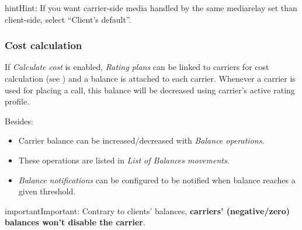 \documentclass[letterpaper,10pt,english]{sphinxmanual}
\begin{document}
\begin{notice}{hint}{Hint:}
If you want carrier-side media handled by the same mediarelay set than client-side, select ``Client's default''.
\end{notice}


\subsubsection{Cost calculation}
\label{administration_portal/brand/providers/carriers:cost-calculation}\label{administration_portal/brand/providers/carriers:id2}
If \emph{Calculate cost} is enabled, \emph{Rating plans} can be linked to carriers for cost calculation (see
{\hyperref[administration_portal/brand/billing/rating_plans:assigning\string-rating\string-plans\string-to\string-carriers]{}}) and a balance is attached to each carrier. Whenever a carrier is used for
placing a call, this balance will be decreased using carrier's active rating profile.

Besides:
\begin{itemize}
\item {} 
Carrier balance can be increased/decreased with \emph{Balance operations}.

\item {} 
These operations are listed in \emph{List of Balances movements}.

\item {} 
\emph{Balance notifications} can be configured to be notified when balance reaches a given threshold.

\end{itemize}

\begin{notice}{important}{Important:}
Contrary to clients' balances, \textbf{carriers' (negative/zero) balances won't disable the carrier}.
\end{notice}
\end{document}
